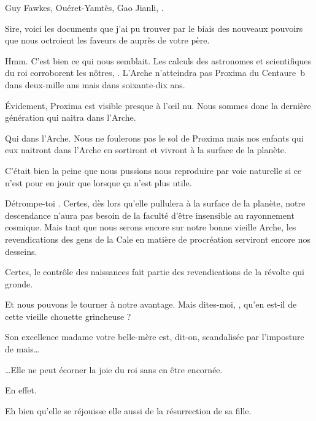 \begin{drama}

  \elenaspeaks Guy Fawkes, Ouéret-Yamtès, Gao Jianli, \general. %

  \intrat{\alexas}

  \alexasspeaks Sire, voici les documents que j’ai pu trouver par le biais des nouveaux pouvoirs que nous octroient les faveurs de \ela auprès de votre père.

  \elenaspeaks {} Hmm.  C’est bien ce qui nous semblait. Les calculs des astronomes et scientifiques du roi corroborent les nôtres, \alexas{}. L’Arche n’atteindra pas Proxima du Centaure~b dans deux-mille ans mais dans soixante-dix ans.

  \alexasspeaks Évidement, Proxima est visible presque à l’œil nu. Nous sommes donc la dernière génération qui naitra dans l’Arche.

  \elenaspeaks Qui  dans l’Arche. Nous ne foulerons pas le sol de Proxima mais nos enfants qui eux naitront dans l’Arche en sortiront et vivront à la surface de la planète.

  \alexasspeaks C’était bien la peine que nous pussions nous reproduire par voie naturelle si ce n’est pour en jouir que lorsque ça n’est plus utile.

  \elenaspeaks Détrompe-toi \alexas. Certes, dès lors qu’elle pullulera à la surface de la planète, notre descendance n’aura pas besoin de la faculté d’être insensible au rayonnement cosmique. Mais tant que nous serons encore sur notre bonne vieille Arche, les revendications des gens de la Cale en matière de procréation serviront encore nos desseins.

  \alexasspeaks Certes, le contrôle des naissances fait partie des revendications de la révolte qui gronde.

  \elenaspeaks Et nous pouvons le tourner à notre avantage. Mais dites-moi, \alexas{}, qu’en est-il de cette vieille chouette grincheuse ?

  \alexasspeaks Son excellence madame votre belle-mère est, dit-on, scandalisée par l’imposture de \ela mais…

  \elenaspeaks …Elle ne peut écorner la joie du roi sans en être encornée.

  \alexasspeaks {} En effet.

  \elenaspeaks Eh bien qu’elle se réjouisse elle aussi de la résurrection de sa fille.


\end{drama}

